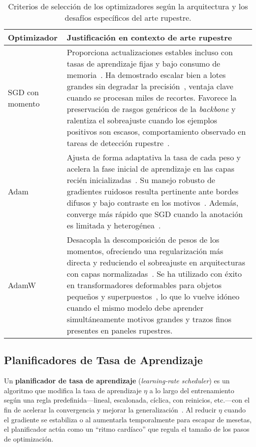 \begin{table}[!h]
    \centering
    \begin{tabular}{p{3.2cm} p{10.5cm}}
        \hline
        \textbf{Optimizador} & \textbf{Justificación en contexto de arte rupestre} \\
        \hline
        SGD con momento &
        Proporciona actualizaciones estables incluso con tasas de aprendizaje fijas y bajo consumo de memoria~\cite{robbins1951stochastic,qian1999momentum}.
        Ha demostrado escalar bien a lotes grandes sin degradar la precisión~\cite{goyal2017}, ventaja clave cuando se procesan miles de recortes.
        Favorece la preservación de rasgos genéricos de la \emph{backbone} y ralentiza el sobreajuste cuando los ejemplos positivos son escasos, comportamiento observado en tareas de detección rupestre~\cite{suhaimi2023}. \\[0.3em]

        Adam &
        Ajusta de forma adaptativa la tasa de cada peso y acelera la fase inicial de aprendizaje en las capas recién inicializadas~\cite{kingma2015adam}.
        Su manejo robusto de gradientes ruidosos resulta pertinente ante bordes difusos y bajo contraste en los motivos~\cite{horn2022ai,jalandoni2022}.
        Además, converge más rápido que SGD cuando la anotación es limitada y heterogénea~\cite{goodfellow2016deep}. \\[0.3em]

        AdamW &
        Desacopla la descomposición de pesos de los momentos, ofreciendo una regularización más directa y reduciendo el sobreajuste en arquitecturas con capas normalizadas~\cite{loshchilov2019adamw}.
        Se ha utilizado con éxito en transformadores deformables para objetos pequeños y superpuestos~\cite{zhu2021,smallobjDETR}, lo que lo vuelve idóneo cuando el mismo modelo debe aprender simultáneamente motivos grandes y trazos finos presentes en paneles rupestres. \\
    \end{tabular}
    \caption{Criterios de selección de los optimizadores según la arquitectura y los desafíos específicos del arte rupestre.}
    \label{tab:optimizadores}
\end{table}


\subsection{Planificadores de Tasa de Aprendizaje}

Un \textbf{planificador de tasa de aprendizaje} (\emph{learning‐rate scheduler}) es un algoritmo que modifica la tasa de aprendizaje \(\eta\) a lo largo del entrenamiento según una regla predefinida—lineal, escalonada, cíclica, con reinicios, etc.—con el fin de acelerar la convergencia y mejorar la generalización~\cite{loshchilov2017,smith2019}.
Al reducir \(\eta\) cuando el gradiente se estabiliza o al aumentarla temporalmente para escapar de mesetas, el planificador actúa como un “ritmo cardíaco” que regula el tamaño de los pasos de optimización.

